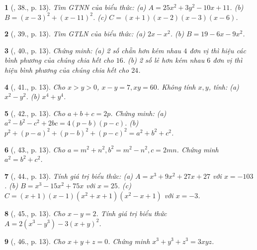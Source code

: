 \documentclass{article}
\newtheorem{baitoan}{}
\begin{document}
\begin{baitoan}[\cite{Tuyen_Toan_8}, 38., p. 13]
	Tìm {\rm GTNN} của biểu thức: (a) $A = 25x^2 + 3y^2 - 10x + 11$. (b) $B = (x - 3)^2 + (x - 11)^2$. (c) $C = (x + 1)(x - 2)(x - 3)(x - 6)$.
\end{baitoan}

\begin{baitoan}[\cite{Tuyen_Toan_8}, 39., p. 13]
	Tìm {\rm GTLN} của biểu thức: (a) $2x - x^2$. (b) $B = 19 - 6x - 9x^2$.
\end{baitoan}

\begin{baitoan}[\cite{Tuyen_Toan_8}, 40., p. 13]
	Chứng minh: (a) 2 số chẵn hơn kém nhau $4$ đơn vị thì hiệu các bình phương của chúng chia hết cho $16$. (b) 2 số lẻ hơn kém nhau $6$ đơn vị thì hiệu bình phương của chúng chia hết cho $24$.
\end{baitoan}

\begin{baitoan}[\cite{Tuyen_Toan_8}, 41., p. 13]
	Cho $x > y > 0$, $x - y = 7,xy = 60$. Không tính $x,y$, tính: (a) $x^2 - y^2$. (b) $x^4 + y^4$.
\end{baitoan}

\begin{baitoan}[\cite{Tuyen_Toan_8}, 42., p. 13]
	Cho $a + b + c = 2p$. Chứng minh: (a) $a^2 - b^2 - c^2 + 2bc = 4(p - b)(p - c)$. (b) $p^2 + (p - a)^2 + (p - b)^2 + (p - c)^2 = a^2 + b^2 + c^2$.
\end{baitoan}

\begin{baitoan}[\cite{Tuyen_Toan_8}, 43., p. 13]
	Cho $a = m^2 + n^2,b^2 = m^2 - n^2,c = 2mn$. Chứng minh $a^2 = b^2 + c^2$.
\end{baitoan}

\begin{baitoan}[\cite{Tuyen_Toan_8}, 44., p. 13]
	Tính giá trị biểu thức: (a) $A = x^3 + 9x^2 + 27x + 27$ với $x = -103$. (b) $B = x^3 - 15x^2 + 75x$ với $x = 25$. (c) $C = (x + 1)(x - 1)(x^2 + x + 1)(x^2 - x + 1)$ với $x = -3$.
\end{baitoan}

\begin{baitoan}[\cite{Tuyen_Toan_8}, 45., p. 13]
	Cho $x - y = 2$. Tính giá trị biểu thức $A = 2(x^3 - y^3) - 3(x + y)^2$.
\end{baitoan}

\begin{baitoan}[\cite{Tuyen_Toan_8}, 46., p. 13]
	Cho $x + y + z = 0$. Chứng minh $x^3 + y^3 + z^3 = 3xyz$.
\end{baitoan}
\end{document}
